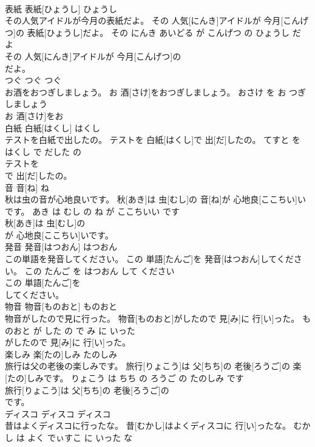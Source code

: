 \documentclass[8pt]{extreport}
\begin{document}
\begin{CJK}{UTF8}{min}
\\	表紙	表紙[ひょうし]	ひょうし	
\\	その人気アイドルが今月の表紙だよ。	その 人気[にんき]アイドルが 今月[こんげつ]の 表紙[ひょうし]だよ。	その にんき あいどる が こんげつ の ひょうし だ よ	
\\	その 人気[にんき]アイドルが 今月[こんげつ]の
\\	だよ。			
\\	つぐ	つぐ	つぐ	
\\	お酒をおつぎしましょう。	お 酒[さけ]をおつぎしましょう。	おさけ を お つぎ しましょう	
\\	お 酒[さけ]をお
\\	白紙	白紙[はくし]	はくし	
\\	テストを白紙で出したの。	テストを 白紙[はくし]で 出[だ]したの。	てすと を はくし で だした の	
\\	テストを
\\	で 出[だ]したの。			
\\	音	音[ね]	ね	
\\	秋は虫の音が心地良いです。	秋[あき]は 虫[むし]の 音[ね]が 心地良[ここちい]いです。	あき は むし の ね が ここちいい です	
\\	秋[あき]は 虫[むし]の
\\	が 心地良[ここちい]いです。			
\\	発音	発音[はつおん]	はつおん	
\\	この単語を発音してください。	この 単語[たんご]を 発音[はつおん]してください。	この たんご を はつおん して ください	
\\	この 単語[たんご]を
\\	してください。			
\\	物音	物音[ものおと]	ものおと	
\\	物音がしたので見に行った。	物音[ものおと]がしたので 見[み]に 行[い]った。	ものおと が した の で み に いった	
\\	がしたので 見[み]に 行[い]った。			
\\	楽しみ	楽[たの]しみ	たのしみ	
\\	旅行は父の老後の楽しみです。	旅行[りょこう]は 父[ちち]の 老後[ろうご]の 楽[たの]しみです。	りょこう は ちち の ろうご の たのしみ です	
\\	旅行[りょこう]は 父[ちち]の 老後[ろうご]の
\\	です。			
\\	ディスコ	ディスコ	ディスコ	
\\	昔はよくディスコに行ったな。	昔[むかし]はよくディスコに 行[い]ったな。	むかし は よく でぃすこ に いった な	

\end{CJK}
\end{document}
